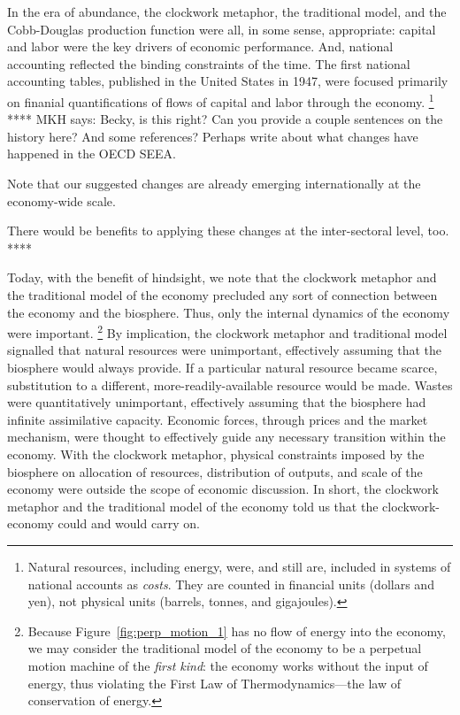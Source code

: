 In the era of abundance, 
the clockwork metaphor, 
the traditional model, 
and the Cobb-Douglas production function 
were all, in some sense, appropriate: 
capital and labor were the key drivers of economic performance.
And, national accounting reflected the binding constraints of the time. 
The first national accounting tables,
published in the United States in 1947,
were focused primarily on finanial quantifications 
of flows of capital and labor
through the economy.%
	\footnote{
	Natural resources, including energy, were, and still are, 
	included in systems of national accounts as \emph{costs}.
	They are counted in financial units
	(dollars and yen), 
	not physical units
	(barrels, tonnes, and gigajoules).
	}
**** 
MKH says: Becky, is this right? Can you provide a couple sentences
on the history here? 
And some references? 
Perhaps write about what changes have happened in the OECD SEEA.

Note that our suggested changes are already 
emerging internationally at the economy-wide scale.

There would be benefits to applying these changes at the inter-sectoral level, too.
****

Today, with the benefit of hindsight, 
we note that the clockwork metaphor and the traditional model of the economy
precluded any sort of connection 
between the economy and the biosphere.
Thus, only the internal dynamics of the economy were important.%
	\footnote{
	Because Figure~\ref{fig:perp_motion_1} has no flow of energy
	into the economy,
	we may consider the traditional model of the economy 
	to be a perpetual motion machine of the \emph{first kind}:
	the economy works without the input of energy, thus violating
	the First Law of Thermodynamics---the 
	law of conservation of energy.\cite{Rao2004}	
	}
By implication, the clockwork metaphor and traditional model 
signalled that natural resources were unimportant, 
effectively assuming that the biosphere would always provide.
If a particular natural resource became scarce, 
substitution to a different, more-readily-available resource would be made.
Wastes were quantitatively unimportant, 
effectively assuming that the biosphere had infinite assimilative capacity.
Economic forces,
through prices and the market mechanism,
were thought to effectively guide any necessary transition
within the economy.
With the clockwork metaphor, physical constraints 
imposed by the biosphere 
on allocation of resources, distribution of outputs, and 
scale of the economy 
were outside the scope of economic discussion.\cite{Daly1995}
In short, the clockwork metaphor and the traditional model of the economy 
told us that the clockwork-economy could and would carry on.

